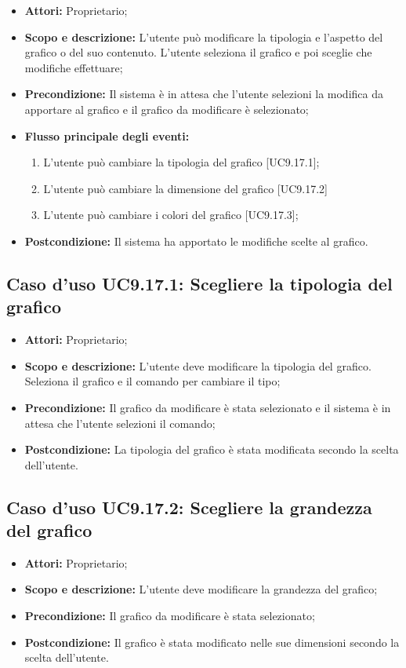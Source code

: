 \begin{itemize}
	\item \textbf{Attori:} Proprietario;
	\item \textbf{Scopo e descrizione:} L'utente può modificare la tipologia e l'aspetto del grafico o del suo contenuto. L'utente seleziona il grafico e poi sceglie che modifiche effettuare;
	\item \textbf{Precondizione:} Il sistema è in attesa che l'utente selezioni la modifica da apportare al grafico e il grafico da modificare è selezionato;
	\item \textbf{Flusso principale degli eventi:}
	\begin{enumerate}
		\item L'utente può cambiare la tipologia del grafico [UC9.17.1];
		\item L'utente può cambiare la dimensione del grafico [UC9.17.2]
		\item L'utente può cambiare i colori del grafico [UC9.17.3];
	\end{enumerate}
	\item \textbf{Postcondizione:} Il sistema ha apportato le modifiche scelte al grafico.
\end{itemize}

\subsection{Caso d'uso UC9.17.1: Scegliere la tipologia del grafico}
\begin{itemize}
	\item \textbf{Attori:} Proprietario;
	\item \textbf{Scopo e descrizione:} L'utente deve modificare la tipologia del grafico. Seleziona il grafico e il comando per cambiare il tipo;
	\item \textbf{Precondizione:} Il grafico da modificare è stata selezionato e il sistema è in attesa che l'utente selezioni il comando;
	\item \textbf{Postcondizione:} La tipologia del grafico è stata modificata secondo la scelta dell'utente.
\end{itemize}

\subsection{Caso d'uso UC9.17.2: Scegliere la grandezza del grafico}
\begin{itemize}
	\item \textbf{Attori:} Proprietario;
	\item \textbf{Scopo e descrizione:} L'utente deve modificare la grandezza del grafico;
	\item \textbf{Precondizione:} Il grafico da modificare è stata selezionato;
	\item \textbf{Postcondizione:} Il grafico è stata modificato nelle sue dimensioni secondo la scelta dell'utente.
\end{itemize}

